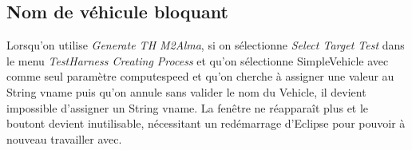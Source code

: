     \subsection*{Nom de véhicule bloquant}
    
    Lorsqu'on utilise \textit{Generate TH M2Alma}, si on sélectionne \textit{Select Target Test} dans le menu \textit{TestHarness Creating Process} et qu'on sélectionne SimpleVehicle avec comme seul paramètre computespeed et qu'on cherche à assigner une valeur au String vname puis qu'on annule sans valider le nom du Vehicle, il devient impossible d'assigner un String vname. La fenêtre ne réapparaît plus et le boutont devient inutilisable, nécessitant un redémarrage d'Eclipse pour pouvoir à nouveau travailler avec.


